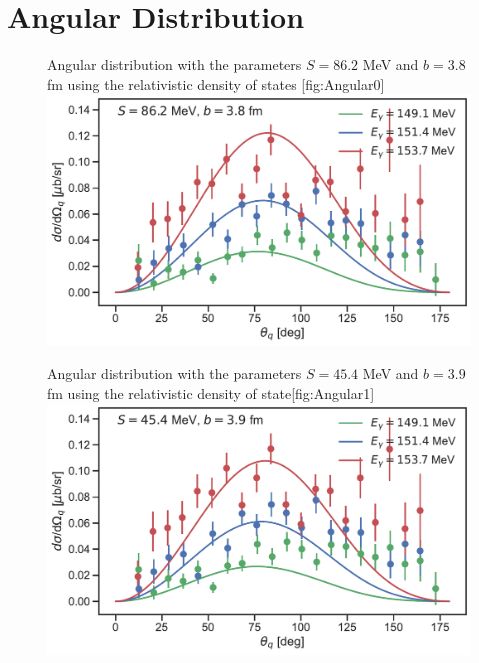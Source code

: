 \chapter{Angular Distribution}\label{sec:Angular}
\begin{figure}[H]
	\begin{sidecaption}{Angular distribution with the parameters $S=86.2$ MeV and $b=3.8$ fm using the relativistic density of states }[fig:Angular0]
		\includegraphics[width=\linewidth]{Figures/MultiDiffcross_rel.pdf}
	\end{sidecaption}
\end{figure}
\begin{figure}[H]
	\begin{sidecaption}{Angular distribution with the parameters $S=45.4$ MeV and $b=3.9$ fm using the relativistic density of state}[fig:Angular1]
		\includegraphics[width=\linewidth]{Figures/MultiDiffcross_rel_2.pdf}
	\end{sidecaption}
\end{figure}
